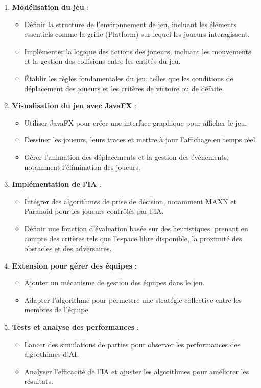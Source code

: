 \documentclass[a4paper,12pt]{article}
\begin{document}
\begin{enumerate}
    \item \textbf{Modélisation du jeu} :
    \begin{itemize}
        \item Définir la structure de l'environnement de jeu, incluant les éléments essentiels comme la grille (Platform) sur lequel les joueurs interagissent.
        \item Implémenter la logique des actions des joueurs, incluant les mouvements et la gestion des collisions entre les entités du jeu.
        \item Établir les règles fondamentales du jeu, telles que les conditions de déplacement des joueurs et les critères de victoire ou de défaite.
    \end{itemize}
    
    \item \textbf{Visualisation du jeu avec JavaFX} :
    \begin{itemize}
        \item Utiliser JavaFX pour créer une interface graphique pour afficher le jeu.
        \item Dessiner les joueurs, leurs traces et mettre à jour l'affichage en temps réel.
        \item Gérer l'animation des déplacements et la gestion des événements, notamment l'élimination des joueurs.
    \end{itemize}
    
    \item \textbf{Implémentation de l’IA} :
    \begin{itemize}
        \item Intégrer des algorithmes de prise de décision, notamment MAXN et Paranoid pour les joueurs contrôlés par l’IA.
        \item Définir une fonction d’évaluation basée sur des heuristiques, prenant en compte des critères tels que l’espace libre disponible, la proximité des obstacles et des adversaires.
    \end{itemize}
    
    \item \textbf{Extension pour gérer des équipes} :
    \begin{itemize}
        \item Ajouter un mécanisme de gestion des équipes dans le jeu.
        \item Adapter l’algorithme pour permettre une stratégie collective entre les membres de l’équipe.
    \end{itemize}
    
    \item \textbf{Tests et analyse des performances} :
    \begin{itemize}
        \item Lancer des simulations de parties pour observer les performances des algorthimes d'AI.
        \item Analyser l'efficacité de l’IA et ajuster les algorithmes pour améliorer les résultats.
    \end{itemize}
\end{enumerate}
\end{document}
